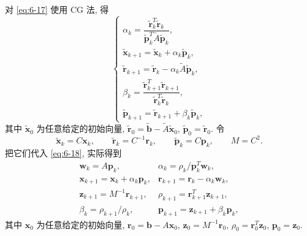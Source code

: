 对 \eqref{eq:6-17} 使用 CG 法, 得
\begin{equation}
  \left\{
  \begin{array}{l}
    \alpha_k=\dfrac{\tilde{\mathbf{r}}_k^T\tilde{\mathbf{r}}_k}
      {\tilde{\mathbf{p}}_k^T\widetilde{A}\tilde{\mathbf{p}}_k},\\[1mm]
    \tilde{\mathbf{x}}_{k+1}=\tilde{\mathbf{x}}_k+\alpha_k\tilde{\mathbf{p}}_k,\\[1mm]
    \tilde{\mathbf{r}}_{k+1}=\tilde{\mathbf{r}}_k
      -\alpha_k\widetilde{A}\tilde{\mathbf{p}}_k,\\[1mm]
    \beta_k=\dfrac{\tilde{\mathbf{r}}_{k+1}^T\tilde{\mathbf{r}}_{k+1}}
      {\tilde{\mathbf{r}}_k^T\tilde{\mathbf{r}}_k},\\[1mm]
    \tilde{\mathbf{p}}_{k+1}=\tilde{\mathbf{r}}_{k+1}
      +\beta_k\tilde{\mathbf{p}}_k,
  \end{array}
  \right.
  \label{eq:6-18}
\end{equation}
其中 $\tilde{\mathbf{x}}_0$ 为任意给定的初始向量, $\tilde{\mathbf{r}}_0=\tilde{\mathbf{b}}-\widetilde{A}\tilde{\mathbf{x}}_0$, $\tilde{\mathbf{p}}_0=\tilde{\mathbf{r}}_0$. 令
\[
  \tilde{\mathbf{x}}_k=C\mathbf{x}_k,\qquad
  \tilde{\mathbf{r}}_k=C^{-1}\mathbf{r}_k,\qquad
  \tilde{\mathbf{p}}_k=C\mathbf{p}_k,\qquad
  M=C^2.
\]
把它们代入 \eqref{eq:6-18}, 实际得到
\[
  \begin{array}{ll}
    \mathbf{w}_k=A\mathbf{p}_k, &
    \alpha_k=\rho_k/\mathbf{p}_k^T\mathbf{w}_k,\\[1mm]
    \mathbf{x}_{k+1}=\mathbf{x}_k+\alpha_k\mathbf{p}_k, &
    \mathbf{r}_{k+1}=\mathbf{r}_k-\alpha_k\mathbf{w}_k,\\[1mm]
    \mathbf{z}_{k+1}=M^{-1}\mathbf{r}_{k+1}, &
    \rho_{k+1}=\mathbf{r}_{k+1}^T\mathbf{z}_{k+1},\\[1mm]
    \beta_k=\rho_{k+1}/\rho_k, &
    \mathbf{p}_{k+1}=\mathbf{z}_{k+1}+\beta_k\mathbf{p}_k,
  \end{array}
\]
其中 $\mathbf{x}_0$ 为任意给定的初始向量, $\mathbf{r}_0=\mathbf{b}-A\mathbf{x}_0$, $\mathbf{z}_0=M^{-1}\mathbf{r}_0$, $\rho_0=\mathbf{r}_0^T\mathbf{z}_0$, $\mathbf{p}_0=\mathbf{z}_0$.


